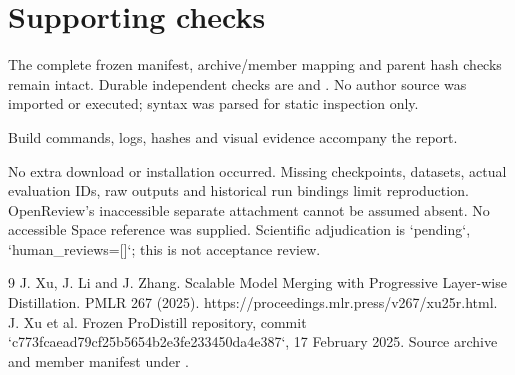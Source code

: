 \documentclass[10pt]{article}
\begin{document}
\section*{Supporting checks}
The complete frozen manifest, archive/member mapping and parent hash checks remain intact. Durable independent checks are and . No author source was imported or executed; syntax was parsed for static inspection only.\par
Build commands, logs, hashes and visual evidence accompany the report.\par
No extra download or installation occurred. Missing checkpoints, datasets, actual evaluation IDs, raw outputs and historical run bindings limit reproduction. OpenReview’s inaccessible separate attachment cannot be assumed absent. No accessible Space reference was supplied. Scientific adjudication is `pending`, `human\_reviews=[]`; this is not acceptance review.\par
9 J. Xu, J. Li and J. Zhang. Scalable Model Merging with Progressive Layer-wise Distillation. PMLR 267 (2025). https://proceedings.mlr.press/v267/xu25r.html. J. Xu et al. Frozen ProDistill repository, commit `c773fcaead79cf25b5654b2e3fe233450da4e387`, 17 February 2025. Source archive and member manifest under .\par
\end{document}
